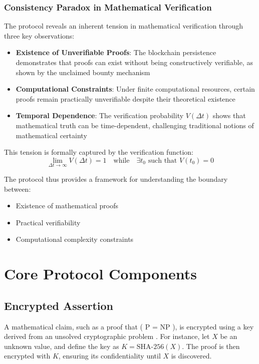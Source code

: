 \documentclass[12pt]{report}
\begin{document}
\subsubsection{Consistency Paradox in Mathematical Verification}
The protocol reveals an inherent tension in mathematical verification through three key observations:

\begin{itemize}
    \item \textbf{Existence of Unverifiable Proofs}: The blockchain persistence demonstrates that proofs can exist without being constructively verifiable, as shown by the unclaimed bounty mechanism
    \item \textbf{Computational Constraints}: Under finite computational resources, certain proofs remain practically unverifiable despite their theoretical existence
    \item \textbf{Temporal Dependence}: The verification probability $V(\Delta t)$ shows that mathematical truth can be time-dependent, challenging traditional notions of mathematical certainty
\end{itemize}

This tension is formally captured by the verification function:
\begin{equation*}
    \lim_{\Delta t \to \infty} V(\Delta t) = 1 \quad \text{while} \quad \exists t_0 \text{ such that } V(t_0) = 0
\end{equation*}

The protocol thus provides a framework for understanding the boundary between:
\begin{itemize}
    \item Existence of mathematical proofs
    \item Practical verifiability
    \item Computational complexity constraints
\end{itemize}

\section{Core Protocol Components}
\subsection{Encrypted Assertion}

A mathematical claim, such as a proof that ( P = NP ), is encrypted using a key derived from an unsolved cryptographic problem \cite{DiffieHellman1976}. For instance, let \( X \) be an unknown value, and define the key as \( K = \text{SHA-256}(X) \). The proof is then encrypted with \( K \), ensuring its confidentiality until \( X \) is discovered.
\end{document}
